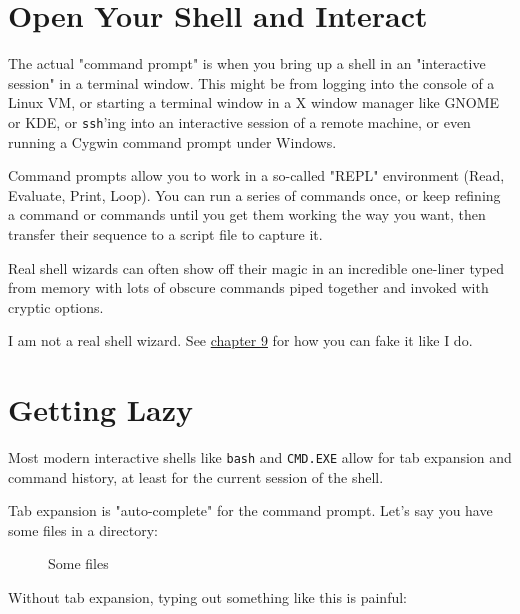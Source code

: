 \documentclass[10pt,american,]{book}
\makeatletter
\newenvironment{Shaded}{\begin{snugshade}}{\end{snugshade}}
\newcommand{\KeywordTok}[1]{\textcolor[rgb]{0.13,0.29,0.53}{\textbf{{#1}}}}
\newcommand{\NormalTok}[1]{{#1}}
\numberwithin{figure}{chapter}
\DeclareRobustCommand{\drcap}[1]{\begin{figure}[H]\caption{#1}\end{figure}}
\DeclareRobustCommand{\drcmd}[1]{\index{Commands!#1@\texttt{#1}}}
\renewcommand{\KeywordTok}[1]{{#1}}
\renewcommand{\NormalTok}[1]{{#1}}
\makeatother
\begin{document}
\section*{Open Your Shell and
Interact}\label{open-your-shell-and-interact}

The actual "command prompt" is when you bring up a shell in an
"interactive session" in a terminal window. This might be from logging
into the console of a Linux VM, or starting a terminal window in a X
window manager like GNOME or KDE, or \texttt{ssh}'ing\drcmd{ssh} into an
interactive session of a remote machine, or even running a Cygwin
command prompt under Windows.

Command prompts allow you to work in a so-called "REPL" environment
(Read, Evaluate, Print, Loop). You can run a series of commands once, or
keep refining a command or commands until you get them working the way
you want, then transfer their sequence to a script file to capture it.

Real shell wizards can often show off their magic in an incredible
one-liner typed from memory with lots of obscure commands piped together
and invoked with cryptic options.

I am not a real shell wizard. See
\protect\hyperlink{how-do-you-know-what-you-dont-know-man}{chapter 9}
for how you can fake it like I do.

\section*{Getting Lazy}\label{getting-lazy}

Most modern interactive shells like \texttt{bash} and \texttt{CMD.EXE}
allow for tab expansion and command history, at least for the current
session of the shell.

Tab expansion is "auto-complete" for the command prompt. Let's say you
have some files in a directory:

\drcap{Some files}

\begin{Shaded}
\end{Shaded}

Without tab expansion, typing out something like this is painful:
\end{document}
